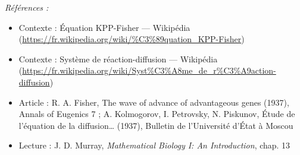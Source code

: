 \documentclass[11pt]{article}
\newenvironment{refs}{\par\small\noindent\emph{Références :}\begin{itemize}\setlength\itemsep{0pt}}{\end{itemize}\normalsize}
\begin{document}
\begin{refs}
\item Contexte : Équation KPP-Fisher --- Wikipédia (\url{https://fr.wikipedia.org/wiki/%C3%89quation_KPP-Fisher})
\item Contexte : Système de réaction-diffusion --- Wikipédia (\url{https://fr.wikipedia.org/wiki/Syst%C3%A8me_de_r%C3%A9action-diffusion})
\item Article : R. A. Fisher, \og{} The wave of advance of advantageous genes \fg{} (1937), Annals of Eugenics 7 ; A. Kolmogorov, I. Petrovsky, N. Piskunov, \og{} Étude de l'équation de la diffusion\dots{} \fg{} (1937), Bulletin de l'Université d'État à Moscou
\item Lecture : J. D. Murray, \textit{Mathematical Biology I: An Introduction}, chap. 13
\end{refs}

\bigskip
\end{document}

